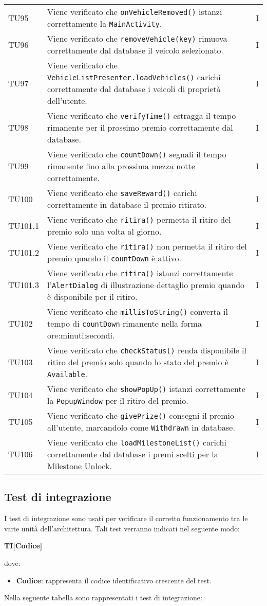 \begin{longtable}{ >{\centering}p{}  >{\centering}p{} >{\centering}p{}
			}
		\tabularnewline	
		TU95 & Viene verificato che \texttt{onVehicleRemoved()} istanzi correttamente la \texttt{MainActivity}. & I 
		\tabularnewline	
		TU96 & Viene verificato che \texttt{removeVehicle(key)} rimuova correttamente dal database il veicolo selezionato. & I 
		\tabularnewline	
		TU97 & Viene verificato che \texttt{VehicleListPresenter.loadVehicles()} carichi correttamente dal database i veicoli di proprietà dell'utente. & I
		\tabularnewline	
		TU98 & Viene verificato che \texttt{verifyTime()} estragga il tempo rimanente per il prossimo premio correttamente dal database. & I 
		\tabularnewline	
		TU99 & Viene verificato che \texttt{countDown()} segnali il tempo rimanente fino alla prossima mezza notte correttamente. & I 
		\tabularnewline	
		TU100 & Viene verificato che \texttt{saveReward()} carichi correttamente in database il premio ritirato. & I 
		\tabularnewline	
		TU101.1 & Viene verificato che \texttt{ritira()} permetta il ritiro del premio solo una volta al giorno. & I 
		\tabularnewline	
		TU101.2 & Viene verificato che \texttt{ritira()} non permetta il ritiro del premio quando il \texttt{countDown} è attivo. & I 
		\tabularnewline	
		TU101.3 & Viene verificato che \texttt{ritira()} istanzi correttamente l'\texttt{AlertDialog} di illustrazione dettaglio premio quando è disponibile per il ritiro. & I 
		
				\tabularnewline
		
		TU102 & Viene verificato che \texttt{millisToString()} converta il tempo di \texttt{countDown} rimanente nella forma ore:minuti:secondi. & I 
		\tabularnewline	
		TU103 & Viene verificato che \texttt{checkStatus()} renda disponibile il ritiro del premio solo quando lo stato del premio è \texttt{Available}. & I
		\tabularnewline	
		TU104 & Viene verificato che \texttt{showPopUp()} istanzi correttamente la \texttt{PopupWindow} per il ritiro del premio. & I 
		\tabularnewline	
		TU105 & Viene verificato che \texttt{givePrize()} consegni il premio all'utente, marcandolo come \texttt{Withdrawn} in database. & I 
		\tabularnewline	
		TU106 & Viene verificato che \texttt{loadMilestoneList()} carichi correttamente dal database i premi scelti per la Milestone Unlock. & I 
		
		
		\end{longtable}
		
		
		\newpage
\subsection{Test di integrazione}
I test di integrazione sono usati per verificare il corretto funzionamento tra le varie unità dell'architettura. Tali test verranno indicati nel seguente modo:\\
	\centerline{\textbf{TI[Codice]}}
dove:
\begin{itemize}
	\item \textbf{Codice}: rappresenta il codice identificativo crescente del test.
\end{itemize}
Nella seguente tabella sono rappresentati i test di integrazione:
\renewcommand{\arraystretch}{1.5}

